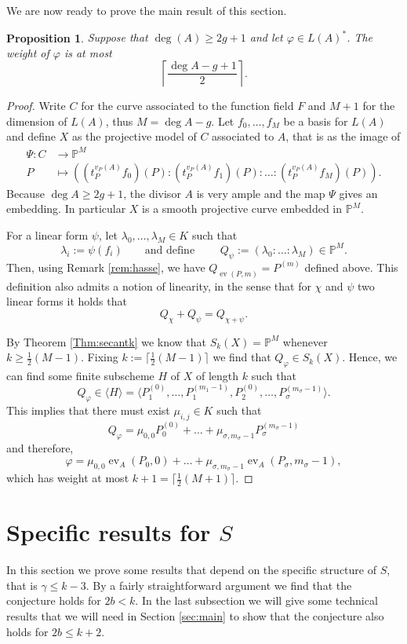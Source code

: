 \documentclass[12pt]{amsart}
\renewcommand{\leq}{\leqslant}
\renewcommand{\geq}{\geqslant}
\DeclareMathOperator{\ev}{ev}
\newtheorem{proposition}[theorem]{Proposition}
\theoremstyle{definition}
\begin{document}
	We are now ready to prove the main result of this section. 
	\begin{proposition}\label{prop:max_weight}
		Suppose that $\deg(A) \geq 2g + 1$ and let $\varphi \in L(A)^\ast$. The weight of $\varphi$ is at most 
		$$ \left \lceil \frac{ \deg A - g + 1 }2\right \rceil.$$ 
	\end{proposition}
	\begin{proof}
		Write $C$ for the curve associated to the function field $F$ and $M+1$ for the dimension of $L(A)$, thus $M = \deg A - g$. Let $f_0, \ldots, f_{M}$ be a basis for $L(A)$ and define $X$ as the projective model of $C$ associated to $A$, that is as the image of 
		\begin{align*}
			\Psi: C &\rightarrow \mathbb P^M \\
			P &\mapsto ((t_P^{v_P(A)}f_0)(P) : (t_P^{v_P(A)}f_1)(P) : \ldots : (t_P^{v_P(A)}f_M)(P)).
		\end{align*}
		Because $\deg A \geq 2g+1$, the divisor $A$ is very ample and the map $\Psi$ gives an embedding. In particular $X$ is a smooth projective curve embedded in $\mathbb P^M.$
		
		For a linear form $\psi$, let $\lambda_0, \ldots, \lambda_M \in K$ such that  
		$$\lambda_i := \psi(f_i) \qquad\text{and define }\qquad Q_\psi := (\lambda_0: \ldots: \lambda_M) \in \mathbb P^M. $$ 
		Then, using Remark \ref{rem:hasse}, we have $Q_{\ev(P, m)} = P^{(m)}$ defined above. This definition also admits a notion of linearity, in the sense that for $\chi$ and $\psi$ two linear forms it holds that 
		$$Q_{\chi} + Q_{\psi} = Q_{\chi + \psi}.$$ 
		
		By Theorem \ref{Thm:secantk} we know that $S_k(X) = \mathbb P^M$ whenever $k \geq \frac 12 (M-1)$. Fixing $k := \lceil \frac 12 (M-1) \rceil$ we find that $Q_\varphi \in S_k(X)$. Hence, we can find some finite subscheme $H$ of $X$ of length $k$ such that
		$$ Q_\varphi \in \langle H \rangle = \langle P_1^{(0)}, \ldots, P_1^{(m_1-1)}, P_2^{(0)}, \ldots, P_\sigma^{(m_\sigma-1)} \rangle.$$
		This implies that there must exist $\mu_{i, j} \in K$ such that 
		$$Q_\varphi = \mu_{0, 0}P_0^{(0)} + \ldots + \mu_{\sigma, m_\sigma-1}P_\sigma^{(m_\sigma - 1)}$$ 
		and therefore, 
		$$\varphi = \mu_{0, 0} \ev_A(P_0, 0) + \ldots + \mu_{\sigma, m_\sigma-1}\ev_A(P_\sigma, m_\sigma - 1),$$
		which has weight at most $k+1 = \lceil \frac 12 (M+1) \rceil$. 
	\end{proof}
	
	\section{Specific results for $S$} \label{Sec:specific}
	In this section we prove some results that depend on the specific structure of $S$, that is $\gamma \leq k-3$. By a fairly straightforward argument we find that the conjecture holds for $2b < k$. In the last subsection we will give some technical results that we will need in Section \ref{sec:main} to show that the conjecture also holds for $2b \leq k+2$.
	
\end{document}
